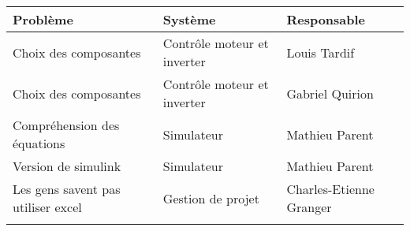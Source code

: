 \begin{tabularx}{\linewidth}{
    |>{\hsize=2.0\hsize}X|%
    >{\hsize=0.5\hsize}X|%
    >{\hsize=0.5\hsize}X|%
  }
    \hline
    \textbf{Problème} & \textbf{Système} & \textbf{Responsable} \\\hline
    Choix des composantes & Contrôle moteur et inverter & Louis Tardif \\\hline
    Choix des composantes & Contrôle moteur et inverter & Gabriel Quirion \\\hline
    Compréhension des équations & Simulateur & Mathieu Parent \\\hline
    Version de simulink & Simulateur & Mathieu Parent \\\hline
    Les gens savent pas utiliser excel & Gestion de projet & Charles-Etienne Granger \\\hline
      &   &   \\\hline
  \end{tabularx}
     